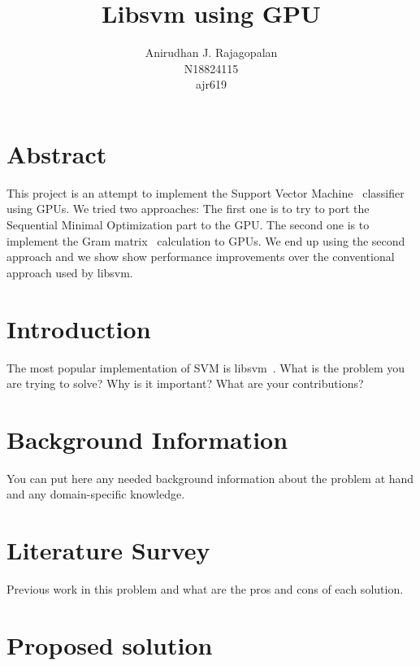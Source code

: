 \documentclass{article}
\begin{document}
\title{Libsvm using GPU}
\author{Anirudhan J. Rajagopalan \\ N18824115 \\ ajr619}
\maketitle




\newpage

\section{Abstract}
This project is an attempt to implement the Support Vector Machine~\cite{cortes1995} classifier using GPUs.
We tried two approaches: 
The first one is to try to port the Sequential Minimal Optimization part to the GPU\@.
The second one is to implement the Gram matrix~\cite{wiki:gram_matrix} calculation to GPUs.
We end up using the second approach and we show show performance improvements over the conventional approach used by libsvm. 
\section{Introduction}
The most popular implementation of SVM is libsvm~\cite{CC01a}.
What is the problem you are trying to solve? Why is it important? What are your contributions?
\section{Background Information}
You can put here any needed background information about the problem at hand and any domain-specific knowledge.
\section{Literature Survey}
Previous work in this problem and what are the pros and cons of each solution.
\section{Proposed solution}
\end{document}
